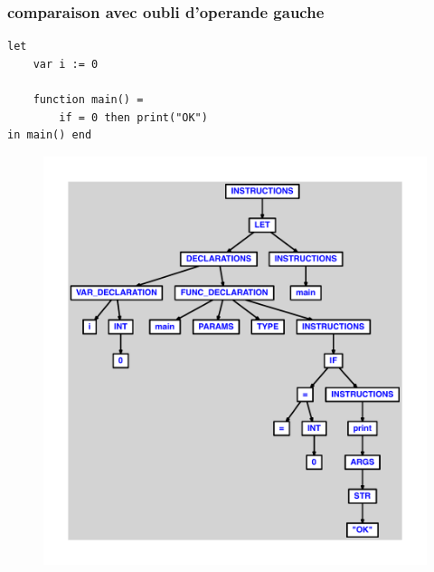 \documentclass{article}
\begin{document}
\subsubsection{comparaison avec oubli d'operande gauche}
\begin{lstlisting}
let
	var i := 0

	function main() =
		if = 0 then print("OK")
in main() end
\end{lstlisting}
\newpage
\begin{figure}[H]
\centering
\includegraphics[max width=\textwidth]{ast/ast_164.pdf}
\end{figure}
\newpage
\end{document}
